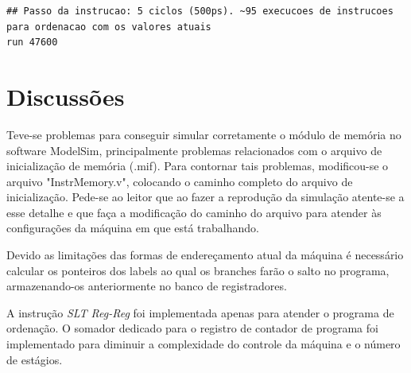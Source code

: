 \documentclass[11pt,a4paper,titlepage]{article}
\begin{document}
\begin{lstlisting}
## Passo da instrucao: 5 ciclos (500ps). ~95 execucoes de instrucoes para ordenacao com os valores atuais
run 47600
\end{lstlisting}

\section{Discussões}

Teve-se problemas para conseguir simular corretamente o módulo de memória no software ModelSim, principalmente problemas relacionados com o arquivo de inicialização de memória (.mif). Para contornar tais problemas, modificou-se o arquivo "InstrMemory.v", colocando o caminho completo do arquivo de inicialização. Pede-se ao leitor que ao fazer a reprodução da simulação atente-se a esse detalhe e que faça a modificação do caminho do arquivo para atender às configurações da máquina em que está trabalhando.

Devido as limitações das formas de endereçamento atual da máquina é necessário calcular os ponteiros dos labels ao qual os branches farão o salto no programa, armazenando-os anteriormente no banco de registradores.

A instrução \textit{SLT Reg-Reg} foi implementada apenas para atender o programa de ordenação. O somador dedicado para o registro de contador de programa foi implementado para diminuir a complexidade do controle da máquina e o número de estágios.



%

\nocite{*}
\end{document}
